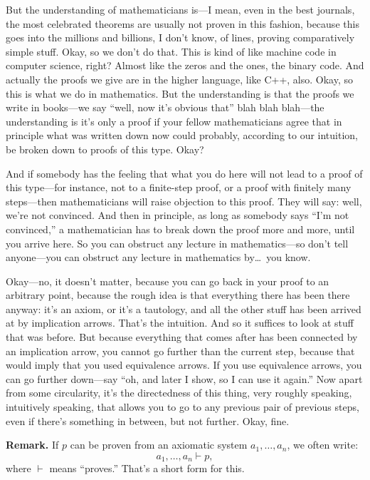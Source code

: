 But the understanding of mathematicians is---I mean, even in the best journals, the most celebrated theorems are usually not proven in this fashion, because this goes into the millions and billions, I don't know, of lines, proving comparatively simple stuff. Okay, so we don't do that. This is kind of like machine code in computer science, right? Almost like the zeros and the ones, the binary code. And actually the proofs we give are in the higher language, like C++, also. Okay, so this is what we do in mathematics. But the understanding is that the proofs we write in books---we say ``well, now it's obvious that'' blah blah blah---the understanding is it's only a proof if your fellow mathematicians agree that in principle what was written down now could probably, according to our intuition, be broken down to proofs of this type. Okay?

And if somebody has the feeling that what you do here will not lead to a proof of this type---for instance, not to a finite-step proof, or a proof with finitely many steps---then mathematicians will raise objection to this proof. They will say: well, we're not convinced. And then in principle, as long as somebody says ``I'm not convinced,'' a mathematician has to break down the proof more and more, until you arrive here. So you can obstruct any lecture in mathematics---so don't tell anyone---you can obstruct any lecture in mathematics by\ldots\ you know.

Okay---no, it doesn't matter, because you can go back in your proof to an arbitrary point, because the rough idea is that everything there has been there anyway: it's an axiom, or it's a tautology, and all the other stuff has been arrived at by implication arrows. That's the intuition. And so it suffices to look at stuff that was before. But because everything that comes after has been connected by an implication arrow, you cannot go further than the current step, because that would imply that you used equivalence arrows. If you use equivalence arrows, you can go further down---say ``oh, and later I show, so I can use it again.'' Now apart from some circularity, it's the directedness of this thing, very roughly speaking, intuitively speaking, that allows you to go to any previous pair of previous steps, even if there's something in between, but not further. Okay, fine.

\textbf{Remark.} If $p$ can be proven from an axiomatic system $a_1, \ldots, a_n$, we often write:
\[
a_1, \ldots, a_n \vdash p,
\]
where $\vdash$ means ``proves.'' That's a short form for this.

